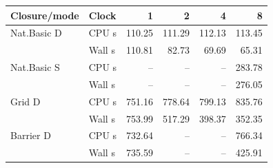 \begin{tabular}{llrrrr}
\toprule
Closure/mode & Clock & 1 & 2 & 4 & 8\\
\midrule
Nat.Basic D & CPU s & 110.25 & 111.29 & 112.13 & 113.45\\
 & Wall s & 110.81 & 82.73 & 69.69 & 65.31\\
Nat.Basic S & CPU s & -- & -- & -- & 283.78\\
 & Wall s & -- & -- & -- & 276.05\\
Grid D & CPU s & 751.16 & 778.64 & 799.13 & 835.76\\
 & Wall s & 753.99 & 517.29 & 398.37 & 352.35\\
Barrier D & CPU s & 732.64 & -- & -- & 766.34\\
 & Wall s & 735.59 & -- & -- & 425.91\\
\bottomrule
\end{tabular}
